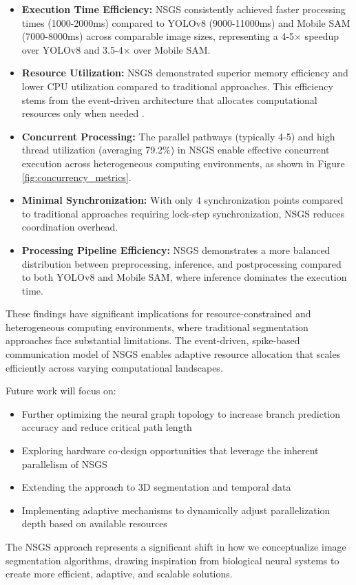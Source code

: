 \documentclass[conference]{IEEEtran}
\begin{document}
\begin{itemize}
    \item \textbf{Execution Time Efficiency:} NSGS consistently achieved faster processing times (1000-2000ms) compared to YOLOv8 (9000-11000ms) and Mobile SAM (7000-8000ms) across comparable image sizes, representing a 4-5× speedup over YOLOv8 and 3.5-4× over Mobile SAM.
    
    \item \textbf{Resource Utilization:} NSGS demonstrated superior memory efficiency and lower CPU utilization compared to traditional approaches. This efficiency stems from the event-driven architecture that allocates computational resources only when needed \cite{Merolla2014}.
    
    \item \textbf{Concurrent Processing:} The parallel pathways (typically 4-5) and high thread utilization (averaging 79.2\%) in NSGS enable effective concurrent execution across heterogeneous computing environments, as shown in Figure \ref{fig:concurrency_metrics}.
    
    \item \textbf{Minimal Synchronization:} With only 4 synchronization points compared to traditional approaches requiring lock-step synchronization, NSGS reduces coordination overhead.
    
    \item \textbf{Processing Pipeline Efficiency:} NSGS demonstrates a more balanced distribution between preprocessing, inference, and postprocessing compared to both YOLOv8 and Mobile SAM, where inference dominates the execution time.
\end{itemize}

These findings have significant implications for resource-constrained and heterogeneous computing environments, where traditional segmentation approaches face substantial limitations. The event-driven, spike-based communication model of NSGS enables adaptive resource allocation that scales efficiently across varying computational landscapes.

Future work will focus on:
\begin{itemize}
    \item Further optimizing the neural graph topology to increase branch prediction accuracy and reduce critical path length
    \item Exploring hardware co-design opportunities that leverage the inherent parallelism of NSGS
    \item Extending the approach to 3D segmentation and temporal data
    \item Implementing adaptive mechanisms to dynamically adjust parallelization depth based on available resources
\end{itemize}

The NSGS approach represents a significant shift in how we conceptualize image segmentation algorithms, drawing inspiration from biological neural systems to create more efficient, adaptive, and scalable solutions.



\end{document}
